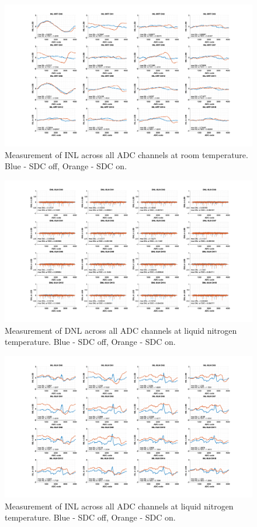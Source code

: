 \begin{figure}[ht!]
  \centering
  \includegraphics[width=1\linewidth]{figures/sdc_measurements/inl_vs_inl_sdc_all_ch_RT.png}
  \caption{Measurement of INL across all ADC channels at room temperature. Blue - SDC off, Orange - SDC on.}
  \label{fig;sdc;inl_all_rt}
\end{figure}

\begin{figure}[ht!]
  \centering
  \includegraphics[width=1\linewidth]{figures/sdc_measurements/dnl_vs_dnl_sdc_all_ch_LN.png}
  \caption{Measurement of DNL across all ADC channels at liquid nitrogen temperature. Blue - SDC off, Orange - SDC on.}
  \label{fig;sdc;dnl_all_ln}
\end{figure}

\begin{figure}[ht!]
  \centering
  \includegraphics[width=1\linewidth]{figures/sdc_measurements/inl_vs_inl_sdc_all_ch_LN.png}
  \caption{Measurement of INL across all ADC channels at liquid nitrogen temperature. Blue - SDC off, Orange - SDC on.}
  \label{fig;sdc;inl_all_ln}
\end{figure}

